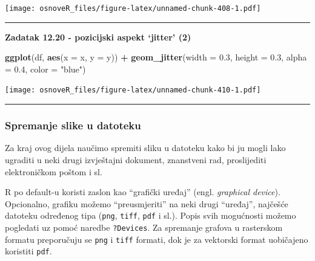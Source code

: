 \documentclass[]{book}
\newenvironment{Shaded}{\begin{snugshade}}{\end{snugshade}}
\newcommand{\KeywordTok}[1]{\textcolor[rgb]{0.13,0.29,0.53}{\textbf{#1}}}
\newcommand{\DataTypeTok}[1]{\textcolor[rgb]{0.13,0.29,0.53}{#1}}
\newcommand{\FloatTok}[1]{\textcolor[rgb]{0.00,0.00,0.81}{#1}}
\newcommand{\StringTok}[1]{\textcolor[rgb]{0.31,0.60,0.02}{#1}}
\newcommand{\CommentTok}[1]{\textcolor[rgb]{0.56,0.35,0.01}{\textit{#1}}}
\newcommand{\OperatorTok}[1]{\textcolor[rgb]{0.81,0.36,0.00}{\textbf{#1}}}
\newcommand{\NormalTok}[1]{#1}
\theoremstyle{definition}
\theoremstyle{definition}
\theoremstyle{definition}
\theoremstyle{remark}
\begin{document}
\texttt{[image: osnoveR\_files/figure-latex/unnamed-chunk-408-1.pdf]}

\begin{center}\rule{0.5\linewidth}{\linethickness}\end{center}

\textbf{Zadatak 12.20 - pozicijski aspekt `jitter' (2)}

\begin{Shaded}
\end{Shaded}

\begin{Shaded}
\begin{Highlighting}[]
\KeywordTok{ggplot}\NormalTok{(df, }\KeywordTok{aes}\NormalTok{(}\DataTypeTok{x =}\NormalTok{ x, }\DataTypeTok{y =}\NormalTok{ y)) }\OperatorTok{+}\StringTok{ }
\StringTok{  }\KeywordTok{geom_jitter}\NormalTok{(}\DataTypeTok{width =} \FloatTok{0.3}\NormalTok{, }\DataTypeTok{height =} \FloatTok{0.3}\NormalTok{, }\DataTypeTok{alpha =} \FloatTok{0.4}\NormalTok{, }\DataTypeTok{color =} \StringTok{"blue"}\NormalTok{)}
\end{Highlighting}
\end{Shaded}

\texttt{[image: osnoveR\_files/figure-latex/unnamed-chunk-410-1.pdf]}

\begin{center}\rule{0.5\linewidth}{\linethickness}\end{center}

\subsubsection{Spremanje slike u
datoteku}\label{spremanje-slike-u-datoteku}

Za kraj ovog dijela naučimo spremiti sliku u datoteku kako bi ju mogli
lako ugraditi u neki drugi izvještajni dokument, znanstveni rad,
proslijediti elektroničkom poštom i sl.

R po default-u koristi zaslon kao ``grafički uređaj'' (engl.
\emph{graphical device}). Opcionalno, grafiku možemo ``preusmjeriti'' na
neki drugi ``uređaj'', najčešće datoteku određenog tipa (\texttt{png},
\texttt{tiff}, \texttt{pdf} i sl.). Popis svih mogućnosti možemo
pogledati uz pomoć naredbe \texttt{?Devices}. Za spremanje grafova u
rasterskom formatu preporučuju se \texttt{png} i \texttt{tiff} formati,
dok je za vektorski format uobičajeno koristiti \texttt{pdf}.
\end{document}
